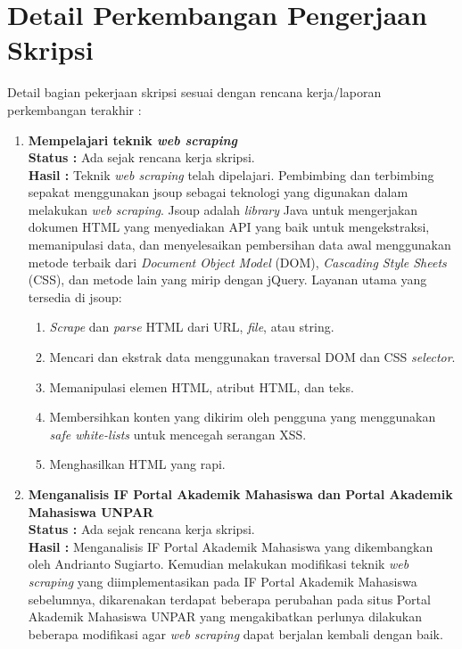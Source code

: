 \documentclass[a4paper,twoside]{article}
\begin{document}
\section{Detail Perkembangan Pengerjaan Skripsi}
Detail bagian pekerjaan skripsi sesuai dengan rencana kerja/laporan perkembangan terakhir :
	\begin{enumerate}
		\item \textbf{Mempelajari teknik \textit{web scraping}}\\
		{\bf Status :} Ada sejak rencana kerja skripsi.\\
		{\bf Hasil :} Teknik \textit{web scraping} telah dipelajari. Pembimbing dan terbimbing sepakat menggunakan jsoup sebagai teknologi yang digunakan dalam melakukan \textit{web scraping}. Jsoup adalah \textit{library} Java untuk mengerjakan dokumen HTML yang menyediakan API yang baik untuk mengekstraksi, memanipulasi data, dan menyelesaikan pembersihan data awal menggunakan metode terbaik dari \textit{Document Object Model} (DOM), \textit{Cascading Style Sheets} (CSS), dan metode lain yang mirip dengan jQuery. Layanan utama yang tersedia di jsoup:
        \begin{enumerate}
            \item \textit{Scrape} dan \textit{parse} HTML dari URL, \textit{file}, atau string.
            \item Mencari dan ekstrak data menggunakan traversal DOM dan CSS \textit{selector}.
            \item Memanipulasi elemen HTML, atribut HTML, dan teks.
            \item Membersihkan konten yang dikirim oleh pengguna yang menggunakan \textit{safe white-lists} untuk mencegah serangan XSS.
            \item Menghasilkan HTML yang rapi.
        \end{enumerate}
		
		
		\item \textbf{Menganalisis IF Portal Akademik Mahasiswa dan Portal Akademik Mahasiswa UNPAR}\\
		{\bf Status :} Ada sejak rencana kerja skripsi.\\
		{\bf Hasil :} Menganalisis IF Portal Akademik Mahasiswa yang dikembangkan oleh Andrianto Sugiarto. Kemudian melakukan modifikasi teknik \textit{web scraping} yang diimplementasikan pada IF Portal Akademik Mahasiswa sebelumnya, dikarenakan terdapat beberapa perubahan pada situs Portal Akademik Mahasiswa UNPAR yang mengakibatkan perlunya dilakukan beberapa modifikasi agar \textit{web scraping} dapat berjalan kembali dengan baik.



\end{enumerate}
\end{document}
